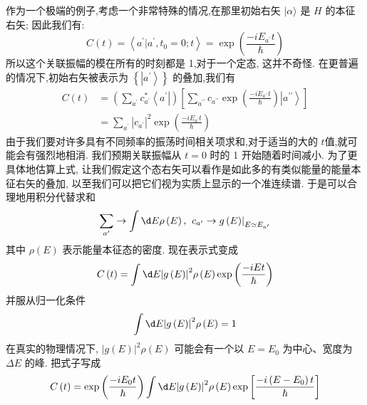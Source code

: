 作为一个极端的例子,考虑一个非常特殊的情况,在那里初始右矢 $|\alpha \rangle$ 是 $H$ 的本征右矢; 因此我们有:
\begin{equation}
	C\left( t\right) = \left\langle {{a}^{\prime } | {a}^{\prime },{t}_{0} = 0;t}\right\rangle = \exp \left( \frac{-i{E}_{{a}^{\prime }}t}{\hbar }\right)
\end{equation}
所以这个关联振幅的模在所有的时刻都是 1,对于一个定态, 这并不奇怪. 在更普遍的情况下,初始右矢被表示为 $\left\{ \left| {a}^{\prime }\right\rangle \right\}$ 的叠加,我们有
\begin{equation}
	\begin{aligned}
		C\left( t\right) &= \left( {\mathop{\sum }\limits_{{a}^{\prime }}{c}_{{a}^{\prime }}^{ * }\left\langle {a}^{\prime }\right| }\right) \left\lbrack {\mathop{\sum }\limits_{{a}^{\prime \prime }}{c}_{{a}^{\prime \prime }}\exp \left( \frac{-i{E}_{{a}^{\prime \prime }}t}{\hbar }\right) \left| {a}^{\prime \prime }\right\rangle }\right\rbrack\\
		&= \mathop{\sum }\limits_{{a}^{\prime }}{\left| {c}_{{a}^{\prime }}\right| }^{2}\exp \left( \frac{-i{E}_{{a}^{\prime }}t}{\hbar }\right)
	\end{aligned}
\end{equation}
由于我们要对许多具有不同频率的振荡时间相关项求和,对于适当的大的 $t$值,就可能会有强烈地相消. 我们预期关联振幅从 $t = 0$ 时的 1 开始随着时间减小.
为了更具体地估算上式, 让我们假定这个态右矢可以看作是如此多的有类似能量的能量本征右矢的叠加, 以至我们可以把它们视为实质上显示的一个准连续谱. 于是可以合理地用积分代替求和
\begin{equation}
	\mathop{\sum }\limits_{{a}^{\prime }} \rightarrow \int {\d E\rho }\left( E\right) ,{\left. \;{c}_{{a}^{\prime }} \rightarrow g\left( E\right) \right| }_{E \simeq {E}_{{a}^{\prime }}}
\end{equation}
其中 $\rho \left( E\right)$ 表示能量本征态的密度. 现在表示式变成
\begin{equation}
	C\left( t\right) = \int {\d E}{\left| g\left( E\right) \right| }^{2}\rho \left( E\right) \exp \left( \frac{-{iEt}}{\hbar }\right)
\end{equation}
并服从归一化条件
\begin{equation}
	\int {\d E}{\left| g\left( E\right) \right| }^{2}\rho \left( E\right) = 1
\end{equation}
在真实的物理情况下, ${\left| g\left( E\right) \right| }^{2}\rho \left( E\right)$ 可能会有一个以 $E = {E}_{0}$ 为中心、宽度为 ${\Delta E}$ 的峰. 把式子写成
\begin{equation}
	C\left( t\right) = \exp \left( \frac{-i{E}_{0}t}{\hbar }\right) \int {\d E}{\left| g\left( E\right) \right| }^{2}\rho \left( E\right) \exp \left\lbrack \frac{-i\left( {E - {E}_{0}}\right) t}{\hbar }\right\rbrack
\end{equation}
